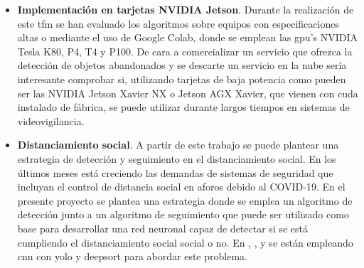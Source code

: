 \begin{itemize}
    \item \textbf{Implementación en tarjetas NVIDIA Jetson}. Durante la realización de este \gls{tfm} se han evaluado los algoritmos sobre equipos con especificaciones altas o mediante el uso de Google Colab, donde se emplean las \gls{gpu}'s NVIDIA Tesla K80, P4, T4 y P100. De cara a comercializar un servicio que ofrezca la detección de objetos abandonados y se descarte un servicio en la nube sería interesante comprobar si, utilizando tarjetas de baja potencia como pueden ser las NVIDIA Jetson Xavier NX o Jetson AGX Xavier, que vienen con \gls{cuda} instalado de fábrica, se puede utilizar durante largos tiempos en sistemas de videovigilancia.
    \item \textbf{Distanciamiento social}. A partir de este trabajo se puede plantear una estrategia de detección y seguimiento en el distanciamiento social. En los últimos meses está creciendo las demandas de sistemas de seguridad que incluyan el control de distancia social en aforos debido al COVID-19. En el presente proyecto se plantea una estrategia donde se emplea un algoritmo de detección junto a un algoritmo de seguimiento que puede ser utilizado como base para desarrollar una red neuronal capaz de detectar si se está cumpliendo el distanciamiento social social o no. En \cite{punn2020monitoring}, \cite{Rezaei_2020}, \cite{Gupta_2020} y \cite{fan2020autonomous} se están empleando \gls{cnn} con \gls{yolo} y \gls{deepsort} para abordar este problema.
    
\end{itemize}